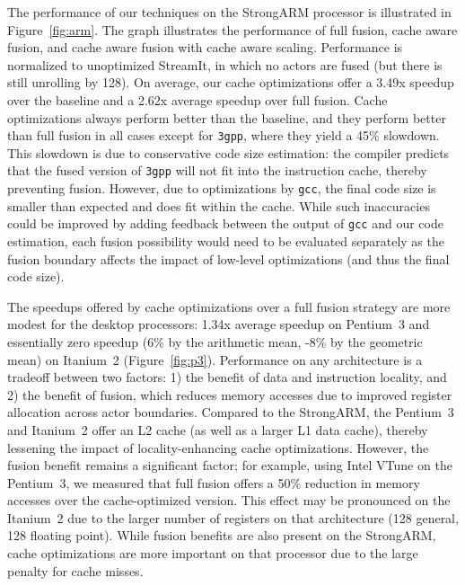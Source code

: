 The performance of our techniques on the StrongARM processor is
illustrated in Figure~\ref{fig:arm}.  The graph illustrates the
performance of full fusion, cache aware fusion, and cache aware fusion
with cache aware scaling.  Performance is normalized to unoptimized
StreamIt, in which no actors are fused (but there is still unrolling
by 128).  On average, our cache optimizations offer a 3.49x speedup
over the baseline and a 2.62x average speedup over full fusion.  Cache
optimizations always perform better than the baseline, and they
perform better than full fusion in all cases except for \texttt{3gpp},
where they yield a 45\% slowdown.  This slowdown is due to
conservative code size estimation: the compiler predicts that the
fused version of \texttt{3gpp} will not fit into the instruction
cache, thereby preventing fusion.  However, due to optimizations by
{\tt gcc}, the final code size is smaller than expected and does fit
within the cache.  While such inaccuracies could be improved by adding
feedback between the output of {\tt gcc} and our code estimation, each
fusion possibility would need to be evaluated separately as the fusion
boundary affects the impact of low-level optimizations (and thus the
final code size).

The speedups offered by cache optimizations over a full fusion
strategy are more modest for the desktop processors: 1.34x average
speedup on Pentium~3 and essentially zero speedup (6\% by the
arithmetic mean, -8\% by the geometric mean) on Itanium~2
(Figure~\ref{fig:p3}).  
Performance on any architecture is a tradeoff between two factors: 1)
the benefit of data and instruction locality, and 2) the benefit of
fusion, which reduces memory accesses due to improved register
allocation across actor boundaries.  Compared to the StrongARM, the
Pentium~3 and Itanium~2 offer an L2 cache (as well as a larger L1 data
cache), thereby lessening the impact of locality-enhancing cache
optimizations.  However, the fusion benefit remains a significant
factor; for example, using Intel VTune on the Pentium~3, we measured
that full fusion offers a 50\% reduction in memory accesses over the
cache-optimized version.  This effect may be pronounced on the
Itanium~2 due to the larger number of registers on that architecture
(128 general, 128 floating point).  While fusion benefits are also
present on the StrongARM, cache optimizations are more important on
that processor due to the large penalty for cache misses.

